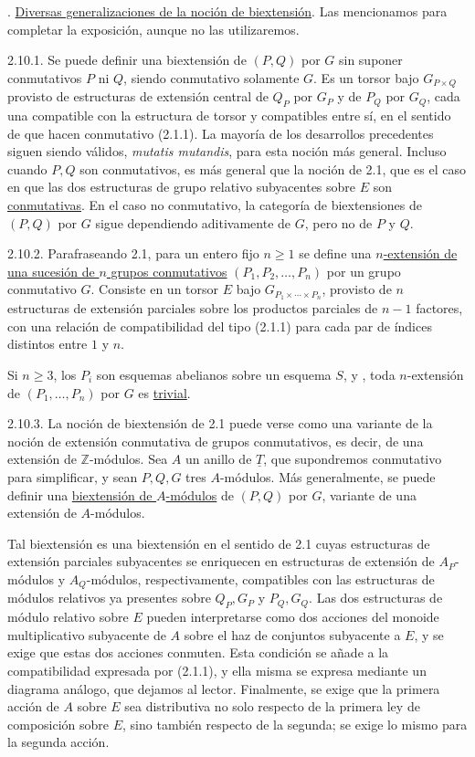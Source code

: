 \par\medskip{}. \underline{Diversas generalizaciones de la noción de
biextensión}. Las mencionamos para completar la exposición, aunque no
las utilizaremos.

2.10.1. Se puede definir una biextensión de $(P,Q)$ por $G$ sin
suponer conmutativos $P$ ni $Q$, siendo conmutativo solamente $G$. Es
un torsor bajo $G_{P\times Q}$ provisto de estructuras de extensión
central de $Q_P$ por $G_P$ y de $P_Q$ por $G_Q$, cada una compatible
con la estructura de torsor y compatibles entre sí, en el sentido de
que hacen conmutativo (2.1.1). La mayoría de los desarrollos
precedentes siguen siendo válidos, \emph{mutatis mutandis}, para esta
noción más general. Incluso cuando $P,Q$ son conmutativos, es más
general que la noción de 2.1, que es el caso en que las dos estructuras
de grupo relativo subyacentes sobre $E$ son \underline{conmutativas}.
En el caso no conmutativo, la categoría de biextensiones de $(P,Q)$
por $G$ sigue dependiendo aditivamente de $G$, pero no de $P$ y $Q$.

2.10.2. Parafraseando 2.1, para un entero fijo $n\geq1$ se define una
\underline{$n$-extensión de una sucesión de $n$ grupos conmutativos}
$(P_1,P_2,\ldots,P_n)$ por un grupo conmutativo $G$. Consiste en un
torsor $E$ bajo $G_{P_1\times\cdots\times P_n}$, provisto de $n$
estructuras de extensión parciales sobre los productos parciales de
$n-1$ factores, con una relación de compatibilidad del tipo (2.1.1)
para cada par de índices distintos entre $1$ y $n$.

Si $n\geq3$, los $P_i$ son esquemas abelianos sobre un esquema $S$, y
, toda $n$-extensión de
$(P_1,\ldots,P_n)$ por $G$ es \underline{trivial}.

2.10.3. La noción de biextensión de 2.1 puede verse como una variante
de la noción de extensión conmutativa de grupos conmutativos, es decir,
de una extensión de $\mathbb Z$-módulos. Sea $A$ un anillo de
$\underline T$, que supondremos conmutativo para simplificar, y sean
$P,Q,G$ tres $A$-módulos. Más generalmente, se puede definir una
\underline{biextensión de $A$-módulos} de $(P,Q)$ por $G$, variante de
una extensión de $A$-módulos.

Tal biextensión es una biextensión en el sentido de 2.1 cuyas
estructuras de extensión parciales subyacentes se enriquecen en
estructuras de extensión de $A_P$-módulos y $A_Q$-módulos,
respectivamente, compatibles con las estructuras de módulos relativos
ya presentes sobre $Q_P,G_P$ y $P_Q,G_Q$. Las dos estructuras de
módulo relativo sobre $E$ pueden interpretarse como dos acciones del
monoide multiplicativo subyacente de $A$ sobre el haz de conjuntos
subyacente a $E$, y se exige que estas dos acciones conmuten. Esta
condición se añade a la compatibilidad expresada por (2.1.1), y ella
misma se expresa mediante un diagrama análogo, que dejamos al lector.
Finalmente, se exige que la primera acción de $A$ sobre $E$ sea
distributiva no solo respecto de la primera ley de composición sobre
$E$, sino también respecto de la segunda; se exige lo mismo para la
segunda acción.

